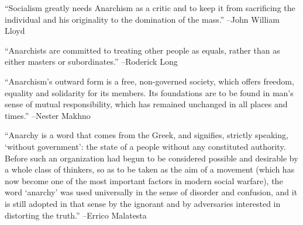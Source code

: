 \documentclass{article}%
\begin{document}
\begin{minipage}{\textwidth}%
\flushleft%
“Socialism greatly needs Anarchism as a critic and to keep it from sacrificing the individual and his originality to the domination of the mass.”%
\linebreak%
\vspace{1mm}%
–John William Lloyd%
\linebreak%
\vspace{1mm}%
\end{minipage}%
\linebreak%
\vspace{1mm}%
\begin{minipage}{\textwidth}%
\flushleft%
“Anarchists are committed to treating other people as equals, rather than as either masters or subordinates.”%
\linebreak%
\vspace{1mm}%
–Roderick Long%
\linebreak%
\vspace{1mm}%
\end{minipage}%
\linebreak%
\vspace{1mm}%
\begin{minipage}{\textwidth}%
\flushleft%
“Anarchism's outward form is a free, non{-}governed society, which offers freedom, equality and solidarity for its members. Its foundations are to be found in man's sense of mutual responsibility, which has remained unchanged in all places and times.”%
\linebreak%
\vspace{1mm}%
–Nester Makhno%
\linebreak%
\vspace{1mm}%
\end{minipage}%
\linebreak%
\vspace{1mm}%
\begin{minipage}{\textwidth}%
\flushleft%
“Anarchy is a word that comes from the Greek, and signifies, strictly speaking, ‘without government’: the state of a people without any constituted authority. Before such an organization had begun to be considered possible and desirable by a whole class of thinkers, so as to be taken as the aim of a movement (which has now become one of the most important factors in modern social warfare), the word ‘anarchy’ was used universally in the sense of disorder and confusion, and it is still adopted in that sense by the ignorant and by adversaries interested in distorting the truth.”%
\linebreak%
\vspace{1mm}%
–Errico Malatesta%
\linebreak%
\vspace{1mm}%
\end{minipage}%
\end{document}
